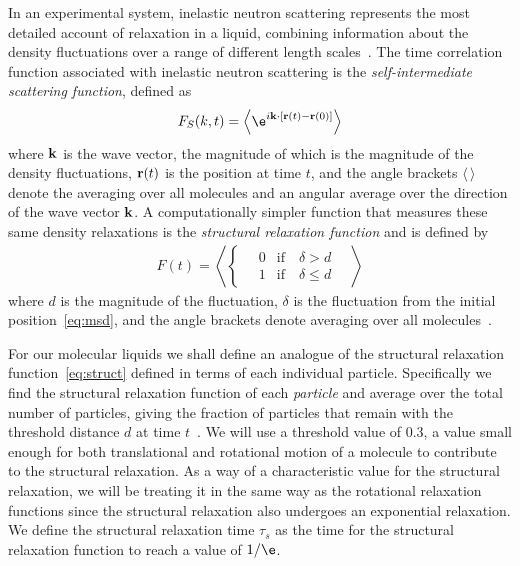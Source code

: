 In an experimental system, inelastic neutron scattering represents the most detailed account of relaxation in a liquid, combining information about the density fluctuations over a range of different length scales~\cite{perera:99}. The time correlation function associated with inelastic neutron scattering is the \emph{self-intermediate scattering function}, defined as
\begin{equation}
    F_{S}(k,t) = \left \langle\e^{i\vect{k} \cdot [\vect r(t)-\vect r(0)]}\right \rangle
\end{equation}
where $\mathbf{k}$ is the wave vector, the magnitude of which is the magnitude of the density fluctuations, $\mathbf{r}(t)$ is the position at time $t$, and the angle brackets $\langle\,\rangle$ denote the averaging over all molecules and an angular average over the direction of the wave vector $\mathbf{k}$. A computationally simpler function that measures these same density relaxations is the \emph{structural relaxation function} and is defined by
\begin{align}
    F(t) = \left \langle \begin{cases}
        \quad0 &\text{if}\quad \delta > d \\
        \quad1 &\text{if}\quad \delta \leq d
    \end{cases} \quad \right \rangle
    \label{eq:struct}
\end{align}
where $d$ is the magnitude of the fluctuation, $\delta$ is the fluctuation from the initial position~\eqref{eq:msd}, and the angle brackets denote averaging over all molecules~\cite{widmer:09}.

For our molecular liquids we shall define an analogue of the structural relaxation function~\eqref{eq:struct} defined in terms of each individual particle. Specifically we find the structural relaxation function of each \emph{particle} and average over the total number of particles, giving the fraction of particles that remain with the threshold distance $d$ at time $t$~. We will use a threshold value of \num{0.3}, a value small enough for both translational and rotational motion of a molecule to contribute to the structural relaxation. As a way of a characteristic value for the structural relaxation, we will be treating it in the same way as the rotational relaxation functions since the structural relaxation also undergoes an exponential relaxation. We define the structural relaxation time $\tau_s$ as the time for the structural relaxation function to reach a value of $1/\e$.

